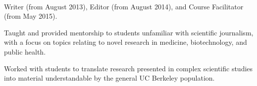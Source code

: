 \\
\begin{tightemize}
\item Writer (from August 2013), Editor (from August 2014), and Course Facilitator (from May 2015).
\item Taught and provided mentorship to students unfamiliar with scientific journalism, with a focus on topics relating to novel research in medicine, biotechnology, and public health.
\item Worked with students to translate research presented in complex scientific studies into material understandable by the general UC Berkeley population.
\end{tightemize}
\sectionsep 